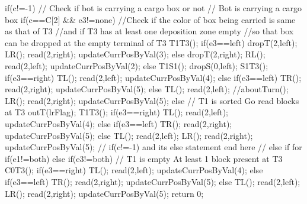 {{        if(c!=-1) // Check if bot is carrying a cargo box or not
        {   
			// Bot is carrying a cargo box
            if(c==C[2] && e3!=none) //Check if the color of box being carried is same as that of T3 
			                        //and if T3 has at least one deposition zone empty 
									//so that box can be dropped at the empty terminal of T3 
            {
                T1T3();
                if(e3==left)
                {
                    dropT(2,left);
                    LR();
                    read(2,right);
                    updateCurrPosByVal(3);
                }
                else
                {
                    dropT(2,right);
                    RL();
                    read(2,left);
                    updateCurrPosByVal(2);
                }
            }
            else
            {
                T1S1();
                dropS(0,left);
                S1T3();
                if(e3==right)
                {
                    TL();
                    read(2,left);
                    updateCurrPosByVal(4);
                }
                else if(e3==left)
                {
                    TR();
                    read(2,right);
                    updateCurrPosByVal(5);
                }
                else
                {
                    TL();
                    read(2,left);
                    //aboutTurn();
                    LR();
                    read(2,right);
                    updateCurrPosByVal(5);
                }
            }
        }
        else // T1 is sorted Go read blocks at T3
        {
			outT(lrFlag);
            T1T3();
            if(e3==right)
            {
                TL();
                read(2,left);
                updateCurrPosByVal(4);
            }
            else if(e3==left)
            {
                TR();
                read(2,right);
                updateCurrPosByVal(5);
            }
            else
            {
                TL();
                read(2,left);
                LR();
                read(2,right);
                updateCurrPosByVal(5);
            }
        } // if(c!=-1) and its else statement end here
    }
	// else if for if(e1!=both)
    else if(e3!=both) // T1 is empty At least 1 block present at T3
    {
        C0T3();
        if(e3==right)
        {
            TL();
            read(2,left);
            updateCurrPosByVal(4);
        }
        else if(e3==left)
        {
            TR();
            read(2,right);
            updateCurrPosByVal(5);
        }
        else
        {
            TL();
            read(2,left);
            LR();
            read(2,right);
            updateCurrPosByVal(5);
        }
    }
    return 0;
}

